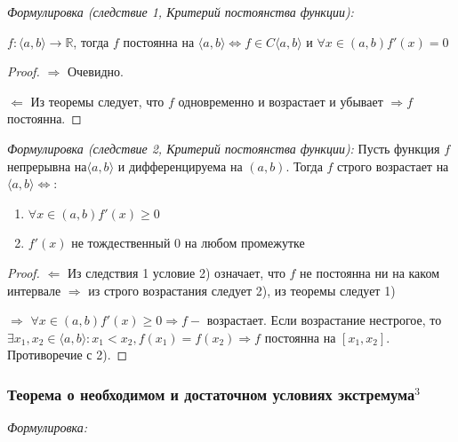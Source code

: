 \documentclass{article}
\begin{document}
\textit{Формулировка (следствие 1, Критерий постоянства функции): }

$f:\langle a, b\rangle \rightarrow \mathbb{R}$, тогда $f$ постоянна на $\langle a, b\rangle \Leftrightarrow f \in C\langle a, b\rangle$ и $ \forall x \in (a, b) f'(x) = 0$

\begin{proof}
\item{$\Rightarrow$} Очевидно.
\item{$\Leftarrow$} Из теоремы следует, что $f$ одновременно и возрастает и убывает $\Rightarrow f$ постоянна. 
\end{proof}

\textit{Формулировка (следствие 2, Критерий постоянства функции): }
Пусть функция $f$ непрерывна на$ \langle a, b\rangle$ и дифференцируема на $(a, b)$. Тогда $f$ строго возрастает на 
$\langle a, b\rangle \Leftrightarrow$:

\begin{enumerate}
    \item $\forall x \in (a, b) f'(x) \geq 0$
    \item $f'(x) $ не тождественный $ 0 $ на любом промежутке
\end{enumerate}

\begin{proof}
\item{$\Leftarrow$}
Из следствия 1 условие 2) означает, что $f$ не постоянна ни на каком интервале $\Rightarrow $ из строго возрастания следует 2), из теоремы следует 1)
\item{$\Rightarrow$}
$\forall x \in (a, b) f'(x) \geq 0 \Rightarrow f -$ возрастает. Если возрастание нестрогое, то $\exists x_1, x_2 \in \langle a, b\rangle: x_1<x_2, f(x_1) = f(x_2) \Rightarrow f $ постоянна на $[x_1, x_2]$. Противоречие с 2).
\end{proof}

\subsubsection{Теорема о необходимом и достаточном условиях экстремума\texorpdfstring{$^3$}{}}

\textit{Формулировка: }
\end{document}

